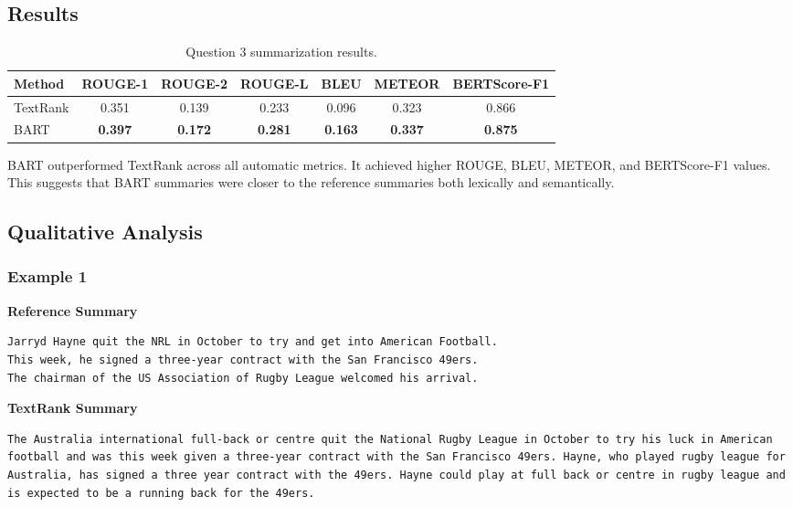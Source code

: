 \documentclass[11pt,a4paper]{article}
\begin{document}
\subsection{Results}

\begin{table}[H]
\centering
\caption{Question 3 summarization results.}
\begin{tabular}{lcccccc}
\toprule
Method & ROUGE-1 & ROUGE-2 & ROUGE-L & BLEU & METEOR & BERTScore-F1 \\
\midrule
TextRank & 0.351 & 0.139 & 0.233 & 0.096 & 0.323 & 0.866 \\
BART & \textbf{0.397} & \textbf{0.172} & \textbf{0.281} & \textbf{0.163} & \textbf{0.337} & \textbf{0.875} \\
\bottomrule
\end{tabular}
\end{table}

BART outperformed TextRank across all automatic metrics. It achieved higher ROUGE, BLEU, METEOR, and BERTScore-F1 values. This suggests that BART summaries were closer to the reference summaries both lexically and semantically.

\subsection{Qualitative Analysis}

\subsubsection{Example 1}

\textbf{Reference Summary}

\begin{lstlisting}
Jarryd Hayne quit the NRL in October to try and get into American Football.
This week, he signed a three-year contract with the San Francisco 49ers.
The chairman of the US Association of Rugby League welcomed his arrival.
\end{lstlisting}

\textbf{TextRank Summary}

\begin{lstlisting}
The Australia international full-back or centre quit the National Rugby League in October to try his luck in American football and was this week given a three-year contract with the San Francisco 49ers. Hayne, who played rugby league for Australia, has signed a three year contract with the 49ers. Hayne could play at full back or centre in rugby league and is expected to be a running back for the 49ers.
\end{lstlisting}
\end{document}
